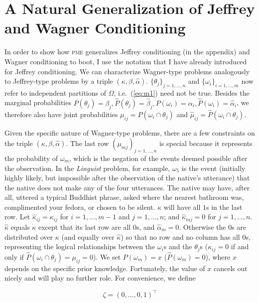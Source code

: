 \section{A Natural Generalization of Jeffrey and Wagner Conditioning}
\label{Generalization}

In order to show how \textsc{pme} generalizes Jeffrey conditioning (in
the appendix) and Wagner conditioning to boot, I use the notation that
I have already introduced for Jeffrey conditioning. We can
characterize Wagner-type problems analogously to Jeffrey-type problems
by a triple $(\kappa,\beta,\hat{\alpha})$.
$\{\theta_{j}\}_{j=1,\ldots,n}$ and $\{\omega_{i}\}_{i=1,\ldots,m}$
now refer to independent partitions of $\Omega$, i.e.\ (\ref{eq:m1})
need not be true. Besides the marginal probabilities
$P(\theta_{j})=\beta_{j}, \hat{P}(\theta_{j})=\hat{\beta}_{j},
P(\omega_{i})=\alpha_{i},\hat{P}(\omega_{i})=\hat{\alpha}_{i}$, we
therefore also have joint probabilities
$\mu_{ij}=P(\omega_{i}\cap\theta_{j})$ and
$\hat{\mu}_{ij}=\hat{P}(\omega_{i}\cap\theta_{j})$.

Given the specific nature of Wagner-type problems, there are a few
constraints on the triple $(\kappa,\beta,\hat{\alpha})$. The last row
$(\mu_{mj})_{j=1,\ldots,n}$ is special because it represents the
probability of $\omega_{m}$, which is the negation of the events
deemed possible after the observation. In the \emph{Linguist} problem,
for example, $\omega_{5}$ is the event (initially highly likely, but
impossible after the observation of the native's utterance) that the
native does not make any of the four utterances. The native may have,
after all, uttered a typical Buddhist phrase, asked where the nearest
bathroom was, complimented your fedora, or chosen to be silent.
$\kappa$ will have all $1$s in the last row. Let
$\hat{\kappa}_{ij}=\kappa_{ij}$ for $i=1,\ldots,m-1$ and
$j=1,\ldots,n$; and $\hat{\kappa}_{mj}=0$ for $j=1,\ldots,n$.
$\hat{\kappa}$ equals $\kappa$ except that its last row are all $0$s,
and $\hat{\alpha}_{m}=0$. Otherwise the $0$s are distributed over
$\kappa$ (and equally over $\hat{\kappa}$) so that no row and no
column has all $0$s, representing the logical relationships between
the $\omega_{i}$s and the $\theta_{j}$s ($\kappa_{ij}=0$ if and only
if $\hat{P}(\omega_{i}\cap\theta_{j})=\mu_{ij}=0$). We set
$P(\omega_{m})=x$ ($\hat{P}(\omega_{m})=0$), where $x$ depends on the
specific prior knowledge. Fortunately, the value of $x$ cancels out
nicely and will play no further role. For convenience, we define

\begin{equation}
\label{eq:zeta}
\zeta=(0,\ldots,0,1)^{\top}
\end{equation}

